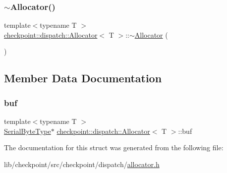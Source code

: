 \mbox{\label{structcheckpoint_1_1dispatch_1_1_allocator_a7048344a23ba3b7bd0fa2ed0123586e5}} 
\subsubsection{\texorpdfstring{$\sim$\+Allocator()}{~Allocator()}}
{\footnotesize\ttfamily template$<$typename T $>$ \\
\hyperlink{structcheckpoint_1_1dispatch_1_1_allocator}{checkpoint\+::dispatch\+::\+Allocator}$<$ T $>$\+::$\sim$\hyperlink{structcheckpoint_1_1dispatch_1_1_allocator}{Allocator} (\begin{DoxyParamCaption}{ }\end{DoxyParamCaption})\hspace{0.3cm}{\ttfamily [inline]}}



\subsection{Member Data Documentation}
\mbox{\label{structcheckpoint_1_1dispatch_1_1_allocator_a3d770c2b7a033aff92ba603be5b1027f}} 
\subsubsection{\texorpdfstring{buf}{buf}}
{\footnotesize\ttfamily template$<$typename T $>$ \\
\hyperlink{namespacecheckpoint_ae57f01cdc0b81776c23b6c7c934c58f5}{Serial\+Byte\+Type}$\ast$ \hyperlink{structcheckpoint_1_1dispatch_1_1_allocator}{checkpoint\+::dispatch\+::\+Allocator}$<$ T $>$\+::buf}



The documentation for this struct was generated from the following file\+:\begin{DoxyCompactItemize}
\item 
lib/checkpoint/src/checkpoint/dispatch/\hyperlink{allocator_8h}{allocator.\+h}\end{DoxyCompactItemize}
